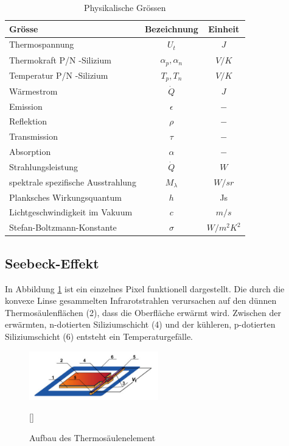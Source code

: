 \begin{table}[H]
	\centering
	\begin{tabular}{l|c|c}
		\rowcolor{gray} Grösse &  Bezeichnung  & Einheit \\
		\hline 
		Thermospannung &  $ U_{t}$ & $J$  \\ 
		\rowcolor{gray} Thermokraft P/N -Silizium  & $\alpha_{p},\alpha_{n}$ & $V/K$\\	
		Temperatur P/N -Silizium &  $T_{p},T_{n}$ & $V/K$ \\
		\rowcolor{gray}Wärmestrom &  $\dot{Q}$ & $J$  \\ 
		Emission & $\epsilon$ & $-$\\	
		\rowcolor{gray}Reflektion &  $\rho $ & $-$ \\
		Transmission & $\tau$ & $-$\\
		\rowcolor{gray}Absorption &  $\alpha$ & $-$  \\ 
		Strahlungsleistung & $\dot{Q}$ & $W$\\
		\rowcolor{gray}spektrale spezifische Ausstrahlung &  $M_{\lambda }$ & $W/sr$  \\
		Planksches Wirkungsquantum &  $ h$ & Js \\ 
		\rowcolor{gray} Lichtgeschwindigkeit im Vakuum & $c $ & $ m/s$ \\ 
 		Stefan-Boltzmann-Konstante & $\sigma$ & $ W/m^2K^2 $ \\ 
	\end{tabular}
	\caption{Physikalische Grössen }
	\label{tab:Legende Physikalische Grössen} 
\end{table}

\subsection{Seebeck-Effekt}
\label{subsec:seebeck}
In Abbildung \ref{fig:AufbauThermo} ist ein einzelnes Pixel funktionell dargestellt. Die durch die konvexe Linse gesammelten Infrarotstrahlen verursachen auf den dünnen Thermosäulenflächen (2), dass die Oberfläche erwärmt wird. Zwischen der erwärmten, n-dotierten Siliziumschicht (4) und der kühleren, p-dotierten Siliziumschicht (6) entsteht ein Temperaturgefälle.   

\begin{figure}[H]
	\centering
	\includegraphics[width=0.5\textwidth]
	{fig/Mems_Thermopile.PNG}
	\caption[Aufbau Thermosäulenelement]{Aufbau des Thermosäulenelement} [\protect\cite{AMG8834}]
	\label{fig:AufbauThermo}
\end{figure}

